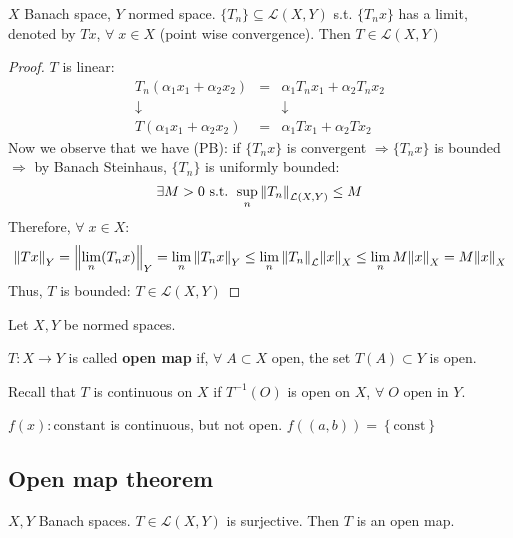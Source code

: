 \begin{corollary}
    \(X\) Banach space, \(Y\) normed space. \(\{ T_n \} \subseteq \mathcal{L}(X, Y)\) s.t. \(\{T_n x\}\) has a limit, denoted by \(Tx\), \(\forall \; x \in X\) (point wise convergence). 
    Then \(T \in \mathcal{L}(X, Y)\)
\end{corollary}
\begin{proof}
    \(T\) is linear: 
    \[
        \begin{array}{ccc}
            T_n(\alpha_1 x_1 + \alpha_2 x_2 ) & = & \alpha_1 T_n x_1 + \alpha_2 T_n x_2 \\
            \downarrow && \downarrow \\
            T(\alpha_1 x_1 + \alpha_2 x_2) & = & \alpha_1 Tx_1 + \alpha_2 Tx_2
        \end{array}
    \]
    Now we observe that we have (PB): if \(\{ T_n x \}\) is convergent \(\Rightarrow \{T_n x\} \) is bounded \(\Rightarrow \) by Banach Steinhaus, \(\{ T_n \}\) is uniformly bounded: 
    \[
        \exists M>0 \text{ s.t. } \sup_n \norm{T_n}_{\mathcal{L}(X, Y)} \leq M 
    \]
    Therefore, \(\forall \; x \in X\):
    \[
        \norm{Tx}_Y = \norm{\lim_n (T_n x)}_Y = \lim_n \norm{T_n x}_Y \leq \lim_n \norm{T_n}_\mathcal{L} \norm{x}_X \leq \lim_n M \norm{x}_X  = M \norm{x}_X
    \]
    Thus, \(T\) is bounded: \(T \in \mathcal{L}(X, Y)\)
\end{proof}
Let \(X, Y\) be normed spaces.
\begin{definition}
    \(T: X \to Y\) is called \textbf{open map} if, \(\forall \; A \subset X \mbox{ open}\), the set \(T(A)\subset Y\) is open.
\end{definition}
\begin{remark}
    Recall that \(T\) is continuous on \(X\) if \(T^{-1}(O)\) is open on \(X\), \(\forall \; O \mbox{ open in } Y\).
\end{remark}
\begin{example}
    \(f(x) : \mbox{constant}\) is continuous, but not open. \(f((a,b)) = \left\{ \mbox{const} \right\}\)
    
\end{example}\subsection{Open map theorem}
\begin{theorem}
    \(X, Y\) Banach spaces. \(T \in \mathcal{L}(X,Y)\) is surjective. Then \(T\) is an open map.
\end{theorem}
